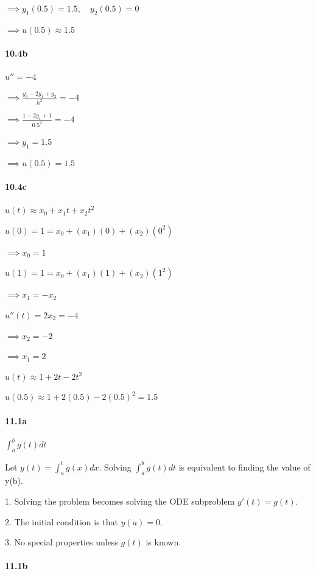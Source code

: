 \documentclass[a4paper, 11pt]{article}
\begin{document}
	$\implies y_{1}(0.5)=1.5,\quad y_{2}(0.5)=0$
	
	$\implies u(0.5)\approx1.5$
	
	
	\paragraph{10.4b}
	
	$u''=-4$
	
	$\implies\frac{y_{0}-2y_{1}+y_{2}}{h^{2}}=-4$
	
	$\implies\frac{1-2y_{1}+1}{0.5^{2}}=-4$
	
	$\implies y_{1}=1.5$
	
	$\implies u(0.5)=1.5$
	
	
	\paragraph{10.4c}
	
	$u(t)\approx x_{0}+x_{1}t+x_{2}t^{2}$
	
	$u(0)=1=x_{0}+(x_{1})(0)+(x_{2})(0^{2})$
	
	$\implies x_{0}=1$
	
	$u(1)=1=x_{0}+(x_{1})(1)+(x_{2})(1^{2})$
	
	$\implies x_{1}=-x_{2}$
	
	$u''(t)=2x_{2}=-4$
	
	$\implies x_{2}=-2$
	
	$\implies x_{1}=2$
	
	$u(t)\approx1+2t-2t^{2}$
	
	$u(0.5)\approx1+2(0.5)-2(0.5)^{2}=1.5$
	
	
	\paragraph{11.1a}
	
	$\int_{a}^{b}g(t)dt$
	
	Let $y(t)=\int_{a}^{t}g(x)dx$. Solving $\int_{a}^{b}g(t)dt$ is equivalent
	to finding the value of y(b).
	
	1. Solving the problem becomes solving the ODE subproblem $y'(t)=g(t)$.
	
	2. The initial condition is that $y(a)=0$.
	
	3. No special properties unless $g(t)$ is known.
	
	
	\paragraph{11.1b}
	
\end{document}

